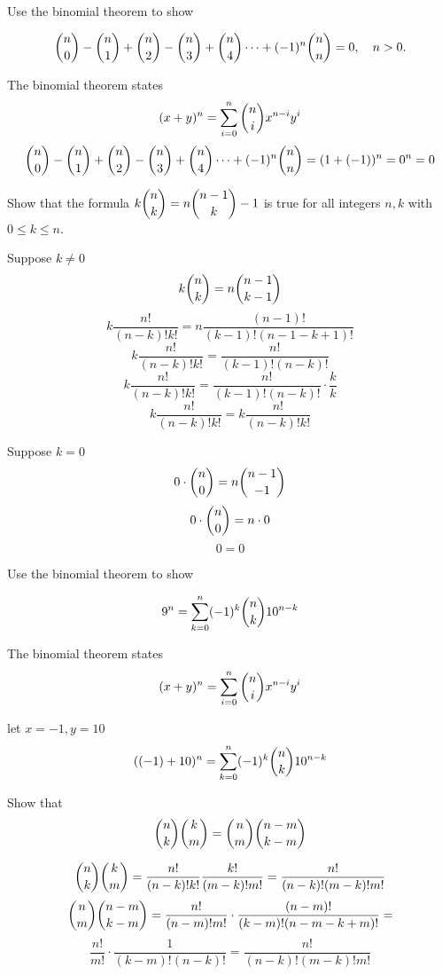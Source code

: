 \documentclass[openany, 11pt]{book}
\begin{document}
\begin{exercise}{}{}
	Use the binomial theorem to show
	\begin{alist}
		\item
		$$
			\dbinom{n}{0}
			- \dbinom{n}{1}
			+ \dbinom{n}{2}
			- \dbinom{n}{3}
			+ \dbinom{n}{4}
			\dots
			+ (-1)^n\dbinom{n}{n} =0, \quad n>0.
		$$
		\item The binomial theorem states
		$$(x+y)^n=\sum\limits_{i=0}^n\dbinom{n}{i}x^{n-i}y^i$$
		$$
			\dbinom{n}{0}
			- \dbinom{n}{1}
			+ \dbinom{n}{2}
			- \dbinom{n}{3}
			+ \dbinom{n}{4}
			\dots
			+ (-1)^n\dbinom{n}{n}=(1+(-1))^n = 0^n = 0
		$$
	\end{alist}
\end{exercise}

\begin{exercise}{}{}
	Show that the formula $k\dbinom{n}{k}=n\dbinom{n-1}
		k-1$
	is true for all integers $n, k$ with $0 \leq k \leq n$.
	\begin{alist}
		\item Suppose $k\neq0$
		$$k\dbinom{n}{k}=n\dbinom{n-1}{k-1}$$
		$$k\dfrac{n!}{(n-k)!k!}=n\dfrac{(n-1)!}{(k-1)!(n-1-k+1)!}$$
		$$k\dfrac{n!}{(n-k)!k!}=\dfrac{n!}{(k-1)!(n-k)!}$$
		$$k\dfrac{n!}{(n-k)!k!}=\dfrac{n!}{(k-1)!(n-k)!}\cdot\dfrac{k}{k}$$
		$$k\dfrac{n!}{(n-k)!k!}=k\dfrac{n!}{(n-k)!k!}$$
		\item Suppose $k=0$
		$$0\cdot\dbinom{n}{0}=n\dbinom{n-1}{-1}$$
		$$0\cdot\dbinom{n}{0}=n\cdot 0$$
		$$0=0$$
	\end{alist}
\end{exercise}

\begin{exercise}{}{}
	Use the binomial theorem to show
	\begin{alist}
		\item
		$$9^n=\sum\limits_{k=0}^{n} (-1)^k\dbinom{n}{k}10^{n-k}$$
		\item The binomial theorem states
		$$(x+y)^n=\sum\limits_{i=0}^n\dbinom{n}{i}x^{n-i}y^i$$
		\item let $x=-1, y=10$
		$$((-1)+10)^n=\sum\limits_{k=0}^{n} (-1)^k\dbinom{n}{k}10^{n-k}$$
	\end{alist}
\end{exercise}

\begin{exercise}{}{}
	Show that
	$$
		\dbinom{n}{k}
		\dbinom{k}{m}=
		\dbinom{n}{m}
		\dbinom{n-m}{k-m}
	$$
	\begin{alist}
		\item
		$$
			\dbinom{n}{k}
			\dbinom{k}{m}=
			\dfrac{n!}{(n-k)!k!}
			\dfrac{k!}{(m-k)!m!}=
			\dfrac{n!}{(n-k)!(m-k)!m!}
		$$
		$$
			\dbinom{n}{m}
			\dbinom{n-m}{k-m}=
			\dfrac{n!}{(n-m)!m!}\cdot
			\dfrac{(n-m)!}{(k-m)!(n-m-k+m)!}=
		$$
		$$
			\dfrac{n!}{m!}\cdot
			\dfrac{1}{(k-m)!(n-k)!}=\dfrac{n!}{(n-k)!(m-k)!m!}
		$$
	\end{alist}
\end{exercise}
\end{document}
